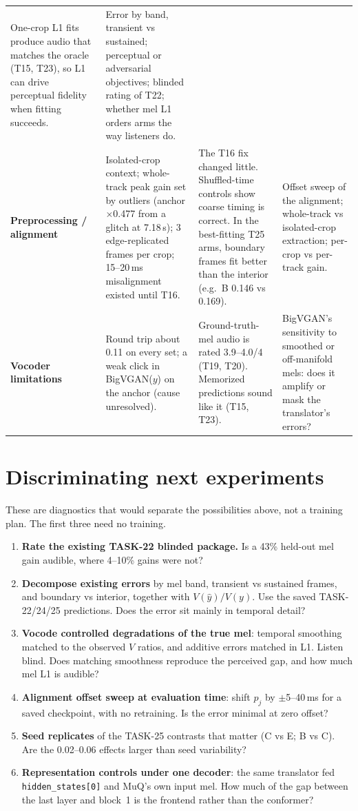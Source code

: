 \documentclass[10pt,letterpaper]{article}
\begin{document}
\begin{longtable}{@{}L{2.3cm}L{4.8cm}L{4.4cm}L{4.6cm}@{}}
One-crop L1 fits produce audio that matches the oracle (T15, T23), so L1 can drive perceptual fidelity when fitting succeeds. &
Error by band, transient vs sustained; perceptual or adversarial objectives; blinded rating of T22; whether mel L1 orders arms the way listeners do.\\
\textbf{Preprocessing / alignment} &
Isolated-crop context; whole-track peak gain set by outliers (anchor $\times$0.477 from a glitch at 7.18\,s); 3 edge-replicated frames per crop; 15--20\,ms misalignment existed until T16. &
The T16 fix changed little. Shuffled-time controls show coarse timing is correct. In the best-fitting T25 arms, boundary frames fit better than the interior (e.g.\ B 0.146 vs 0.169). &
Offset sweep of the alignment; whole-track vs isolated-crop extraction; per-crop vs per-track gain.\\
\textbf{Vocoder limitations} &
Round trip about 0.11 on every set; a weak click in BigVGAN($y$) on the anchor (cause unresolved). &
Ground-truth-mel audio is rated 3.9--4.0/4 (T19, T20). Memorized predictions sound like it (T15, T23). &
BigVGAN's sensitivity to smoothed or off-manifold mels: does it amplify or mask the translator's errors?\\
\bottomrule
\end{longtable}
\endgroup

\section{Discriminating next experiments}
\label{sec:next}
These are diagnostics that would separate the possibilities above, not a training plan. The first three need no training.
\begin{enumerate}
\item \textbf{Rate the existing TASK-22 blinded package.} Is a 43\% held-out mel gain audible, where 4--10\% gains were not?
\item \textbf{Decompose existing errors} by mel band, transient vs sustained frames, and boundary vs interior, together with $V(\hat y)/V(y)$. Use the saved TASK-22/24/25 predictions. Does the error sit mainly in temporal detail?
\item \textbf{Vocode controlled degradations of the true mel}: temporal smoothing matched to the observed $V$ ratios, and additive errors matched in L1. Listen blind. Does matching smoothness reproduce the perceived gap, and how much mel L1 is audible?
\item \textbf{Alignment offset sweep at evaluation time}: shift $p_j$ by $\pm$5--40\,ms for a saved checkpoint, with no retraining. Is the error minimal at zero offset?
\item \textbf{Seed replicates} of the TASK-25 contrasts that matter (C vs E; B vs C). Are the 0.02--0.06 effects larger than seed variability?
\item \textbf{Representation controls under one decoder}: the same translator fed \texttt{hidden\_states[0]} and MuQ's own input mel. How much of the gap between the last layer and block~1 is the frontend rather than the conformer?
\end{enumerate}
\end{document}
